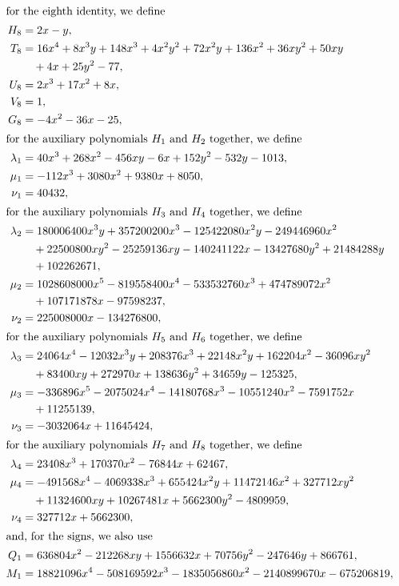 \documentclass[11pt]{article}
\begin{document}
\begin{align*}
\intertext{for the eighth identity, we define}
H_{8}&=2x-y,\\
T_{8}&=16x^{4}+8x^{3}y+148x^{3}+4x^{2}y^{2}+72x^{2}y+136x^{2}+36xy^{2}+50xy\\
&\quad+4x+25y^{2}-77,\\
U_{8}&=2x^{3}+17x^{2}+8x,\\
V_{8}&=1,\\
G_{8}&=-4x^{2}-36x-25,\\
\intertext{for the auxiliary polynomials $H_{1}$ and $H_{2}$ together, we define}
\lambda_{1}&=40x^{3}+268x^{2}-456xy-6x+152y^{2}-532y-1013,\\
\mu_{1}&=-112x^{3}+3080x^{2}+9380x+8050,\\
\nu_{1}&=40432,\\
\intertext{for the auxiliary polynomials $H_{3}$ and $H_{4}$ together, we define}
\lambda_{2}&=180006400x^{3}y+357200200x^{3}-125422080x^{2}y-249446960x^{2}\\
&\quad+22500800xy^{2}-25259136xy-140241122x-13427680y^{2}+21484288y\\
&\quad+102262671,\\
\mu_{2}&=1028608000x^{5}-819558400x^{4}-533532760x^{3}+474789072x^{2}\\
&\quad+107171878x-97598237,\\
\nu_{2}&=225008000x-134276800,\\
\intertext{for the auxiliary polynomials $H_{5}$ and $H_{6}$ together, we define}
\lambda_{3}&=24064x^{4}-12032x^{3}y+208376x^{3}+22148x^{2}y+162204x^{2}-36096xy^{2}\\
&\quad+83400xy+272970x+138636y^{2}+34659y-125325,\\
\mu_{3}&=-336896x^{5}-2075024x^{4}-14180768x^{3}-10551240x^{2}-7591752x\\
&\quad+11255139,\\
\nu_{3}&=-3032064x+11645424,\\
\intertext{for the auxiliary polynomials $H_{7}$ and $H_{8}$ together, we define}
\lambda_{4}&=23408x^{3}+170370x^{2}-76844x+62467,\\
\mu_{4}&=-491568x^{4}-4069338x^{3}+655424x^{2}y+11472146x^{2}+327712xy^{2}\\
&\quad+11324600xy+10267481x+5662300y^{2}-4809959,\\
\nu_{4}&=327712x+5662300,\\
\intertext{and, for the signs, we also use}
Q_{1}&=636804x^{2}-212268xy+1556632x+70756y^{2}-247646y+866761,\\
M_{1}&=18821096x^{4}-508169592x^{3}-1835056860x^{2}-2140899670x-675206819,\\

\end{align*}
\end{document}
